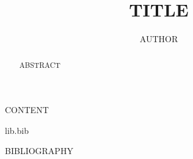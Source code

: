 \documentclass{llncs}
\begin{document}
\title{TITLE}

\author{AUTHOR}


\maketitle              %

\begin{abstract}

ABSTRACT

\end{abstract}

CONTENT

%
%
\begin{filecontents}{lib.bib}

BIBLIOGRAPHY

\end{filecontents}
\end{document}
